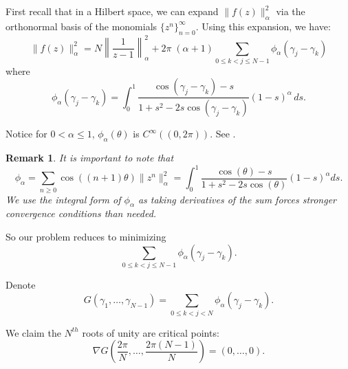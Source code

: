 \documentclass{article}
\newtheorem*{remark}{Remark}
\begin{document}
First recall that in a Hilbert space, we can expand $\|f(z)\|^2_\alpha$ via the orthonormal basis of the monomials $\{z^n\}_{n=0}^\infty$. Using this expansion, we have:
\[
\|f(z)\|^2_\alpha = N \left\|\frac{1}{z-1}\right\|^2_{\alpha}+ 2\pi \;(\alpha+1)\sum_{0 \leq k < j \leq N-1} \phi_\alpha (\gamma_j - \gamma_k)
\]
where
\[
\phi_\alpha (\gamma_j - \gamma_k) = \int_0^1
\frac{\cos(\gamma_j - \gamma_k)- s}
{1 + s^2 - 2s \cos(\gamma_j - \gamma_k)}(1 - s)^\alpha \, ds.
\]

Notice for $0 < \alpha \leq 1$, $\phi_\alpha(\theta)$ is $C^\infty((0,2\pi))$. See \cite{ABF2021}. 

\begin{remark}
    It is important to note that $$\phi_\alpha=\sum_{n\geq 0} \cos((n+1)\theta)\|z^n\|_\alpha^2= \int_0^1 \frac{\cos(\theta)- s}{1+s^2-2s\cos(\theta)}(1-s)^\alpha ds.$$ 
    We use the integral form of $\phi_\alpha$ as taking derivatives of the sum forces stronger convergence conditions than needed. 
\end{remark}


So our problem reduces to minimizing
$$ \sum_{0 \leq k < j \leq N-1} \phi_\alpha(\gamma_j - \gamma_k).$$

Denote
$$G(\gamma_1, \dots, \gamma_{N-1}) = \sum_{0 \leq k < j < N} \phi_\alpha(\gamma_j - \gamma_k).$$

We claim the $N^{th}$ roots of unity are critical points:
$$\nabla G\left(\frac{2\pi}{N}, \dots, \frac{2\pi (N-1)}{N}\right) = (0, \dots, 0).$$



\end{document}
